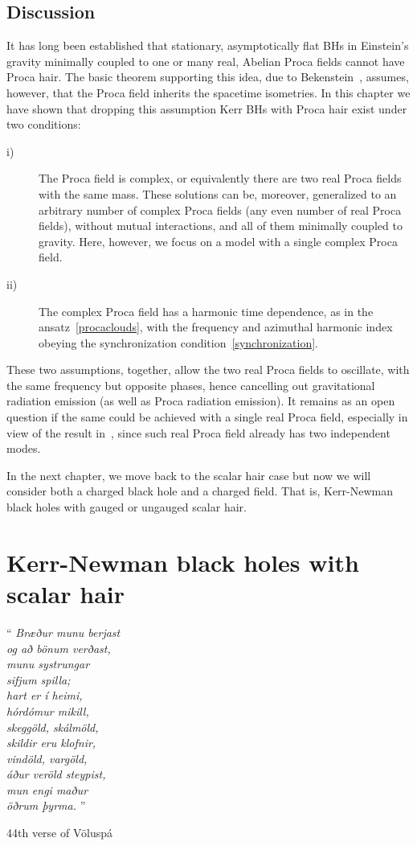 \section{Discussion}
\label{sec_discussion}
It has long been established that stationary, asymptotically flat BHs in Einstein's gravity minimally coupled to one or many real, Abelian Proca fields cannot have Proca hair.
The basic theorem supporting this idea, due to Bekenstein~\cite{Bekenstein:1971hc,Bekenstein:1972ky}, assumes, however, that the Proca field inherits the spacetime isometries.
In this chapter we have shown that dropping this assumption Kerr BHs with Proca hair exist under two conditions:
\begin{description}
\item[i)] The Proca field is complex, or equivalently there are two real Proca fields with the same mass. These solutions can be, moreover, generalized to an arbitrary number of complex Proca fields (any even number of real Proca fields), without mutual interactions, and all of them minimally coupled to gravity. Here, however, we focus on a model with a single complex Proca field. 
\item[ii)] The complex Proca field has a harmonic time dependence, as in the ansatz~\eqref{procaclouds}, with the frequency and azimuthal harmonic index obeying the synchronization condition~\eqref{synchronization}.
\end{description}
These two assumptions, together, allow the two real Proca fields to oscillate, with the same frequency but opposite phases, hence cancelling out gravitational radiation emission (as well as Proca radiation emission).
It remains as an open question if the same could be achieved with a single real Proca field, especially in view of the result in~\cite{Wang:2015fgp}, since such real Proca field already has two independent modes. 

\bigskip

In the next chapter, we move back to the scalar hair case but now we will consider both a charged black hole and a charged field.
That is, Kerr-Newman black holes with gauged or ungauged scalar hair.
\chapter{Kerr-Newman black holes with scalar hair}
\label{ch:KN}

\epigraph{``\emph{
Bræður munu berjast \\
og að bönum verðast, \\
munu systrungar \\
sifjum spilla; \\
hart er í heimi, \\
hórdómur mikill, \\
skeggöld, skálmöld, \\
skildir eru klofnir, \\
vindöld, vargöld, \\
áður veröld steypist, \\
mun engi maður \\
öðrum þyrma. 
} 
''}{44th verse of Völuspá}


